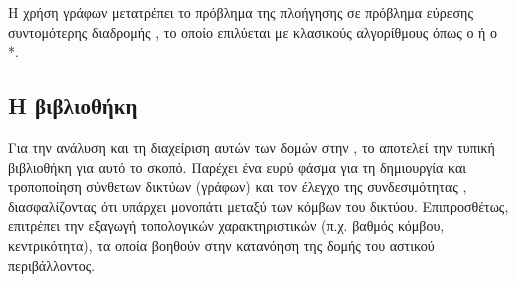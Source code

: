 Η χρήση γράφων μετατρέπει το πρόβλημα της πλοήγησης σε πρόβλημα
εύρεσης συντομότερης διαδρομής , το οποίο
επιλύεται με κλασικούς αλγορίθμους όπως ο  ή ο
*.

\subsection{Η βιβλιοθήκη }

Για την ανάλυση και τη διαχείριση αυτών των δομών στην ,
το  αποτελεί την τυπική βιβλιοθήκη για αυτό το σκοπό.
Παρέχει ένα ευρύ φάσμα για τη δημιουργία και τροποποίηση σύνθετων
δικτύων (γράφων) και τον έλεγχο της συνδεσιμότητας
, διασφαλίζοντας ότι υπάρχει μονοπάτι μεταξύ
των κόμβων του δικτύου. Επιπροσθέτως, επιτρέπει την εξαγωγή
τοπολογικών χαρακτηριστικών (π.χ. βαθμός κόμβου, κεντρικότητα), τα
οποία βοηθούν στην κατανόηση της δομής του αστικού περιβάλλοντος.
